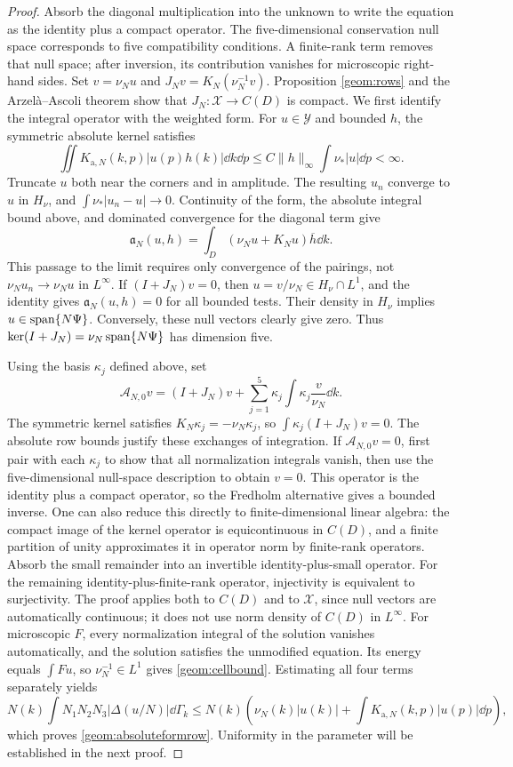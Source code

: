 \begin{proof}
Absorb the diagonal multiplication into the unknown to write the
equation as the identity plus a compact operator. The five-dimensional
conservation null space corresponds to five compatibility conditions.
A finite-rank term removes that null space; after inversion, its
contribution vanishes for microscopic right-hand sides.
Set $v=\nu_Nu$ and $J_Nv=K_N(\nu_N^{-1}v)$.
Proposition \ref{geom:rows} and the Arzel\`a--Ascoli theorem show that
$J_N:\mathcal X\to C(D)$ is compact.
We first identify the integral operator with the weighted form.
For $u\in\mathcal Y$ and bounded $h$, the symmetric absolute kernel satisfies
\[
 \iint K_{\mathrm a,N}(k,p)|u(p)h(k)|\dd k\dd p
       \le C\|h\|_\infty\int\nu_*|u|\dd p<\infty.
\]
Truncate $u$ both near the corners and in amplitude. The resulting
$u_n$ converge to $u$ in $H_\nu$, and
$\int\nu_*|u_n-u|\to0$. Continuity of the form, the absolute integral
bound above, and dominated convergence for the diagonal term give
\[
 \mathfrak a_N(u,h)=\int_D(\nu_Nu+K_Nu)\overline h\dd k.
\]
This passage to the limit requires only convergence of the pairings,
not $\nu_Nu_n\to\nu_Nu$ in $L^\infty$.
If $(I+J_N)v=0$, then $u=v/\nu_N\in H_\nu\cap L^1$, and the identity
gives $\mathfrak a_N(u,h)=0$ for all bounded tests. Their density in
$H_\nu$ implies $u\in\operatorname{span}\{N\Psi\}$.
Conversely, these null vectors clearly give zero. Thus
$\operatorname{ker}(I+J_N)=\nu_N\operatorname{span}\{N\Psi\}$ has dimension five.

Using the basis $\kappa_j$ defined above, set
\[
 \mathcal A_{N,0}v=(I+J_N)v+
           \sum_{j=1}^5\kappa_j\int\kappa_j\frac v{\nu_N}\dd k.
\]
The symmetric kernel satisfies $K_N\kappa_j=-\nu_N\kappa_j$, so
$\int\kappa_j(I+J_N)v=0$. The absolute row bounds justify these
exchanges of integration.
If $\mathcal A_{N,0}v=0$, first pair with each $\kappa_j$ to show that
all normalization integrals vanish, then use the five-dimensional
null-space description to obtain $v=0$.
This operator is the identity plus a compact operator, so the Fredholm
alternative gives a bounded inverse.
One can also reduce this directly to finite-dimensional linear algebra:
the compact image of the kernel operator is equicontinuous in $C(D)$,
and a finite partition of unity approximates it in operator norm by
finite-rank operators. Absorb the small remainder into an invertible
identity-plus-small operator. For the remaining identity-plus-finite-rank
operator, injectivity is equivalent to surjectivity.
The proof applies both to $C(D)$ and to $\mathcal X$, since null vectors
are automatically continuous; it does not use norm density of $C(D)$
in $L^\infty$.
For microscopic $F$, every normalization integral of the solution
vanishes automatically, and the solution satisfies the unmodified equation.
Its energy equals $\int Fu$, so $\nu_N^{-1}\in L^1$ gives
\eqref{geom:cellbound}. Estimating all four terms separately yields
\[
 N(k)\int N_1N_2N_3|\Delta(u/N)|\dd\Gamma_k
 \le N(k)\left(\nu_N(k)|u(k)|+
                         \int K_{\mathrm a,N}(k,p)|u(p)|\dd p\right),
\]
which proves \eqref{geom:absoluteformrow}.
Uniformity in the parameter will be established in the next proof.
\end{proof}

